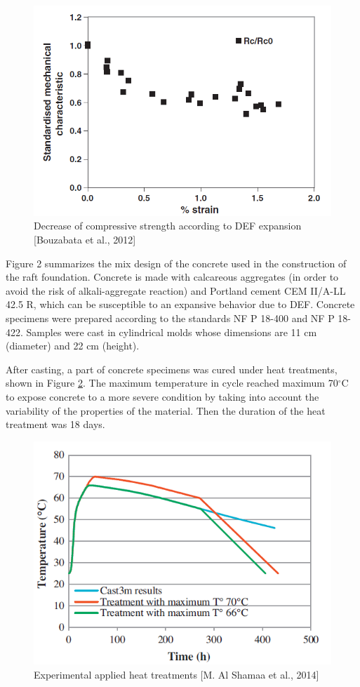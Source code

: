 \begin{figure}[h!]
  \centering
  \includegraphics[width=0.8\linewidth]{Reference/Bouzabata3.png}
  \caption{Decrease of compressive strength according to DEF expansion [Bouzabata et al., 2012]}
  \label{Bouzabata (2012)3}
\end{figure}


\clearpage

Figure 2 summarizes the mix design of the concrete used in the construction of the raft foundation. Concrete is made with calcareous
aggregates (in order to avoid the risk of alkali-aggregate reaction) and Portland cement CEM II/A-LL 42.5 R, which can be susceptible to an expansive behavior due to DEF. Concrete specimens were prepared according to the standards NF P 18-400 and NF P 18-422. Samples were cast in cylindrical molds whose dimensions are 11 cm (diameter) and 22 cm (height).

After casting, a part of concrete specimens was cured under heat treatments, shown in Figure \ref{Shamaa1}. The maximum temperature in cycle reached maximum 70$^\circ$C to expose concrete to a more severe condition by taking into account the variability of the properties of the material. Then the duration of the heat treatment was 18 days.

\begin{figure}[h!]
  \centering
  \includegraphics[width=0.8\linewidth]{Reference/Shamaa1.png}
  \caption{Experimental applied heat treatments [M. Al Shamaa et al., 2014]}
  \label{Shamaa1}
\end{figure}

